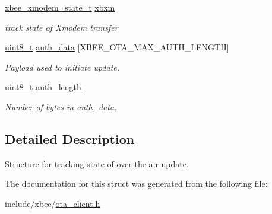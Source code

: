 \begin{DoxyCompactItemize}
\begin{tabbing}
\end{tabbing}\item 
\hyperlink{structxbee__xmodem__state__t}{xbee\+\_\+xmodem\+\_\+state\+\_\+t} \hyperlink{group__xbee__ota__client_ga198adacee7500d0135a88d6ecc591bf5}{xbxm}
\begin{DoxyCompactList}\small\item\em track state of Xmodem transfer \end{DoxyCompactList}\item 
\hyperlink{group__hal__dos_gae1affc9ca37cfb624959c866a73f83c2}{uint8\+\_\+t} \hyperlink{group__xbee__ota__client_ga93137186f6fec6ed6ba4db70db04ca1f}{auth\+\_\+data} \mbox{[}X\+B\+E\+E\+\_\+\+O\+T\+A\+\_\+\+M\+A\+X\+\_\+\+A\+U\+T\+H\+\_\+\+L\+E\+N\+G\+TH\mbox{]}
\begin{DoxyCompactList}\small\item\em Payload used to initiate update. \end{DoxyCompactList}\item 
\hyperlink{group__hal__dos_gae1affc9ca37cfb624959c866a73f83c2}{uint8\+\_\+t} \hyperlink{group__xbee__ota__client_ga67b236f1ec1fbada8e400218c6e5c1f7}{auth\+\_\+length}
\begin{DoxyCompactList}\small\item\em Number of bytes in {\ttfamily auth\+\_\+data}. \end{DoxyCompactList}\end{DoxyCompactItemize}


\subsection{Detailed Description}
Structure for tracking state of over-\/the-\/air update. 

The documentation for this struct was generated from the following file\+:\begin{DoxyCompactItemize}
\item 
include/xbee/\hyperlink{ota__client_8h}{ota\+\_\+client.\+h}\end{DoxyCompactItemize}
